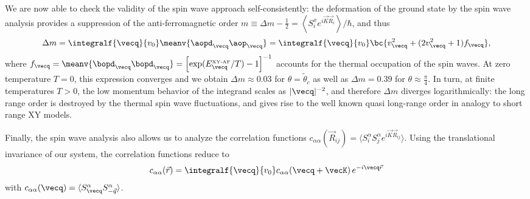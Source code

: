 We are now able to check the validity of the spin wave approach self-consistently: the deformation of the ground state by the spin wave analysis
provides a suppression of the anti-ferromagnetic order $ m \equiv  \Delta m - \frac{1}{2}=\left\langle S^x_i e^{i {\vec K} {\vec R_i}} \right\rangle / \hbar$,
and thus
%
\begin{align}
    \Delta m= \integralf{\vecq}{v_0} \meanv{ \aopd_{\vecq} \aop_{\vecq} } = \integralf{\vecq}{v_0}  \bc{ v_{\vecq}^2 + (2 v_{\vecq}^2 + 1) f_{\vecq} },
\end{align}
%
where $f_{\vecq} = \meanv{ \bopd_\vecq \bopd_\vecq } = \left[\exp(E^{\mbox{\tiny XY-AF}}_{\vecq}/ T)-1\right]^{-1}$ accounts for the thermal occupation of the spin waves. At zero temperature $T=0$, this expression converges and  we obtain $\Delta m \approx 0.03$ for $\theta = \tilde\theta_c$ as well as $\Delta m = 0.39$ for $\theta \approx \frac{\pi}{4}$. In turn, at finite temperatures $T>0$, the low momentum behavior of  the integrand scales as $|{\vecq}|^{-2}$, and therefore $\Delta m$ diverges logarithmically: the long range order is destroyed by the thermal spin wave fluctuations, and gives rise to the well known
quasi long-range order in analogy to short range XY models.

Finally, the spin wave analysis also allows us to analyze the correlation functions
 $c_{\alpha\alpha}({\vec R}_{ij})=\langle S^\alpha_i S^\alpha_{j} e^{i {\vec K} {\vec R}_{i j}} \rangle$. Using
 the translational invariance of our system, the correlation functions reduce to
%
\begin{align}
    c_{\alpha\alpha}({\vec r}) = \integralf{\vecq}{v_0} c_{\alpha\alpha}({\vecq+\vecK}) \, e^{-i {\vecq} {\vec r}}
\end{align}
%
with $c_{\alpha\alpha}({\vecq}) = \langle S^\alpha_{\vecq} S^\alpha_{-\vec{q}}\rangle$.
